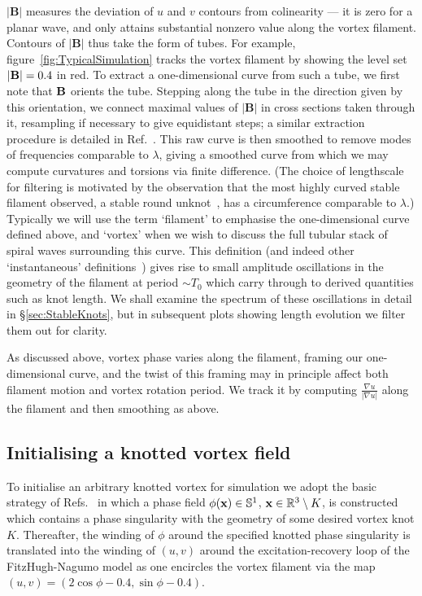 $|\mathbf{B}|$ measures the deviation of $u$ and $v$ contours from colinearity --- it is zero for a planar wave, and only attains substantial nonzero value along the vortex filament. Contours of $|\mathbf{B}|$ thus take the form of tubes. For example, figure~\ref{fig:TypicalSimulation} tracks the vortex filament by showing the level set $|{\bf B}| = 0.4$ in red. To extract a one-dimensional curve from such a tube, we first note that $\bf B$ orients the tube. Stepping along the tube in the direction given by this orientation, we connect maximal values of $|\mathbf{B}|$ in cross sections taken through it, resampling if necessary to give equidistant steps; a similar extraction procedure is detailed in Ref.~\citep{Winfree1990}. This raw curve is then smoothed to remove modes of frequencies comparable to $\lambda$, giving a smoothed curve from which we may compute curvatures and torsions via finite difference. (The choice of lengthscale for filtering is motivated by the observation that the most highly curved stable filament observed, a stable round unknot~\citep{Courtemanche1990}, has a circumference comparable to $\lambda$.) Typically we will use the term `filament' to emphasise the one-dimensional curve defined above, and `vortex' when we wish to discuss the full tubular stack of spiral waves surrounding this curve. This definition (and indeed other `instantaneous' definitions~\citep{Dowle1997}) gives rise to small amplitude oscillations in the geometry of the filament at period $\sim T_0$ which carry through to derived quantities such as knot length. We shall examine the spectrum of these oscillations in detail in \S\ref{sec:StableKnots}, but in subsequent plots showing length evolution we filter them out for clarity. 

As discussed above, vortex phase varies along the filament, framing our one-dimensional curve, and the twist of this framing may in principle affect both filament motion and vortex rotation period. We track it by computing $\frac{\nabla u}{|\nabla u|}$ along the filament and then smoothing as above. 

\subsection{Initialising a knotted vortex field}

To initialise an arbitrary knotted vortex for simulation we adopt the basic strategy of Refs.~\citep{Sutcliffe2003,Maucher2016} in which a phase field $\phi( {\bf x}) \in \mathbb{S}^1$, ${\bf x} \in \mathbb{R}^3\setminus K$, is constructed which contains a phase singularity with the geometry of some desired vortex knot $K$. Thereafter, the winding of $\phi$ around the specified knotted phase singularity is translated into the winding of $(u,v)$ around the excitation-recovery loop of the FitzHugh-Nagumo model as one encircles the vortex filament via the map $ (u,v) = (2 \cos \phi - 0.4, \sin \phi - 0.4)$.

